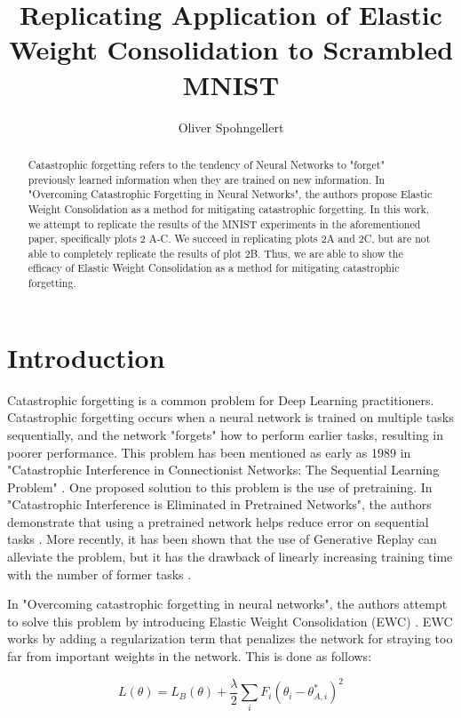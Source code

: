 \documentclass{article}
\title{Replicating Application of Elastic Weight Consolidation to Scrambled MNIST}
\author{
	Oliver Spohngellert
}
\begin{document}
\maketitle

\begin{abstract}
	Catastrophic forgetting refers to the tendency of Neural Networks to "forget" previously learned information when they are trained on new information. In "Overcoming Catastrophic Forgetting in Neural Networks", the authors propose Elastic Weight Consolidation as a method for mitigating catastrophic forgetting. In this work, we attempt to replicate the results of the MNIST experiments in the aforementioned paper, specifically plots 2 A-C. We succeed in replicating plots 2A and 2C, but are not able to completely replicate the results of plot 2B. Thus, we are able to show the efficacy of Elastic Weight Consolidation as a method for mitigating catastrophic forgetting.
\end{abstract}

\section{Introduction}

Catastrophic forgetting is a common problem for Deep Learning practitioners. Catastrophic forgetting occurs when a neural network is trained on multiple tasks sequentially, and the network "forgets" how to perform earlier tasks, resulting in poorer performance. This problem has been mentioned as early as 1989 in "Catastrophic Interference in Connectionist Networks: The Sequential Learning Problem" \cite{cfo1989}. One proposed solution to this problem is the use of pretraining. In "Catastrophic Interference is Eliminated in Pretrained Networks", the authors demonstrate that using a pretrained network helps reduce error on sequential tasks \cite{pretrain}. More recently, it has been shown that the use of Generative Replay can alleviate the problem, but it has the drawback of linearly increasing training time with the number of former tasks \cite{generative}.

In "Overcoming catastrophic forgetting in neural networks", the authors attempt to solve this problem by introducing Elastic Weight Consolidation (EWC) \cite{ewc}. EWC works by adding a regularization term that penalizes the network for straying too far from important weights in the network. This is done as follows:

$$
L(\theta) = L_{B}(\theta) + \frac{\lambda}{2} \sum_{i}F_{i}(\theta_{i} - \theta^{*}_{A,i})^2
$$
\end{document}
